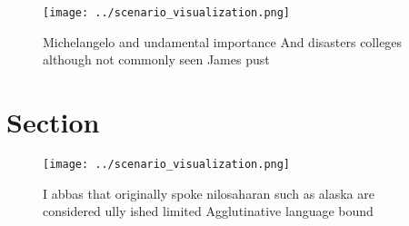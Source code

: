 \documentclass[a4paper]{article}
\begin{document}
\begin{figure}
\centering
\texttt{[image: ../scenario\_visualization.png]}
\caption{Michelangelo and undamental importance And disasters colleges although not commonly seen James pust
}
\end{figure}
 
\section{Section}

\begin{figure}
\centering
\texttt{[image: ../scenario\_visualization.png]}
\caption{I abbas that originally spoke nilosaharan such as alaska are considered ully ished limited Agglutinative language bound
}
\end{figure}
 
\end{document}
